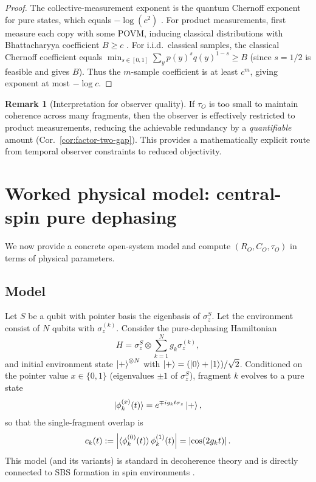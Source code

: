 \documentclass[11pt]{article}
\newcommand{\1}{\mathbf{1}}
\theoremstyle{definition}
\newtheorem{remark}{Remark}
\theoremstyle{plain}
\begin{document}
\begin{proof}
The collective-measurement exponent is the quantum Chernoff exponent for pure states, which equals $-\log(c^2)$ \citep{Audenaert2007,NussbaumSzkola2009}.
For product measurements, first measure each copy with some POVM, inducing classical distributions with Bhattacharyya coefficient $B\ge c$ \citep{FuchsCaves1994,Jozsa1994}.
For i.i.d.\ classical samples, the classical Chernoff coefficient equals $\min_{s\in[0,1]}\sum_y p(y)^s q(y)^{1-s}\ge B$ (since $s=1/2$ is feasible and gives $B$).
Thus the $m$-sample coefficient is at least $c^m$, giving exponent at most $-\log c$.
\end{proof}

\begin{remark}[Interpretation for observer quality]
If $\tau_O$ is too small to maintain coherence across many fragments, then the observer is effectively restricted to product measurements, reducing the achievable redundancy by a \emph{quantifiable} amount (Cor.~\ref{cor:factor-two-gap}).
This provides a mathematically explicit route from temporal observer constraints to reduced objectivity.
\end{remark}

\section{Worked physical model: central-spin pure dephasing}
\label{sec:centralspin}

We now provide a concrete open-system model and compute $(R_O,C_O,\tau_O)$ in terms of physical parameters.

\subsection{Model}

Let $S$ be a qubit with pointer basis the eigenbasis of $\sigma_z^S$.
Let the environment consist of $N$ qubits with $\sigma_z^{(k)}$.
Consider the pure-dephasing Hamiltonian
\begin{equation}
H = \sigma_z^S \otimes \sum_{k=1}^N g_k \sigma_z^{(k)},
\label{eq:centralspin-H}
\end{equation}
and initial environment state $\ket{+}^{\otimes N}$ with $\ket{+}=(\ket{0}+\ket{1})/\sqrt{2}$.
Conditioned on the pointer value $x\in\{0,1\}$ (eigenvalues $\pm1$ of $\sigma_z^S$), fragment $k$ evolves to a pure state
\[
\ket{\phi_k^{(x)}(t)} = e^{\mp i g_k t \sigma_z}\ket{+},
\]
so that the single-fragment overlap is
\begin{equation}
c_k(t):=\left|\braket{\phi_k^{(0)}(t)}{\phi_k^{(1)}(t)}\right|=\left|\cos(2 g_k t)\right|.
\label{eq:ck}
\end{equation}
This model (and its variants) is standard in decoherence theory and is directly connected to SBS formation in spin environments \citep{KorbiczReview2021,RoszakKorbicz2019}.
\end{document}

